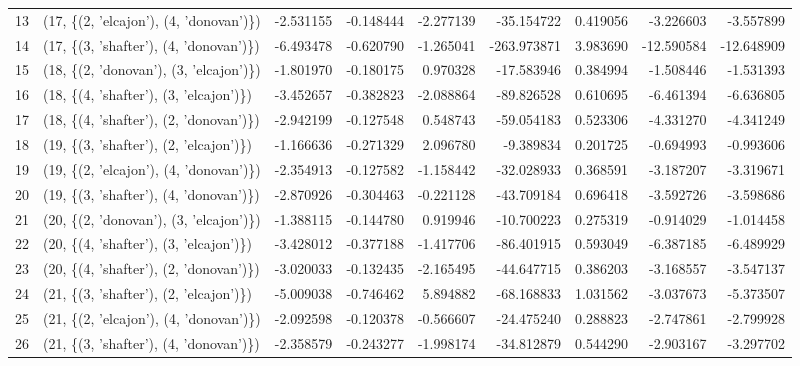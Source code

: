 \begin{tabular}{llrrrrrrr}
13 &  (17, \{(2, 'elcajon'), (4, 'donovan')\}) &  -2.531155 &  -0.148444 &  -2.277139 &   -35.154722 &   0.419056 &  -3.226603 &  -3.557899 \\
14 &  (17, \{(3, 'shafter'), (4, 'donovan')\}) &  -6.493478 &  -0.620790 &  -1.265041 &  -263.973871 &   3.983690 & -12.590584 & -12.648909 \\
15 &  (18, \{(2, 'donovan'), (3, 'elcajon')\}) &  -1.801970 &  -0.180175 &   0.970328 &   -17.583946 &   0.384994 &  -1.508446 &  -1.531393 \\
16 &  (18, \{(4, 'shafter'), (3, 'elcajon')\}) &  -3.452657 &  -0.382823 &  -2.088864 &   -89.826528 &   0.610695 &  -6.461394 &  -6.636805 \\
17 &  (18, \{(4, 'shafter'), (2, 'donovan')\}) &  -2.942199 &  -0.127548 &   0.548743 &   -59.054183 &   0.523306 &  -4.331270 &  -4.341249 \\
18 &  (19, \{(3, 'shafter'), (2, 'elcajon')\}) &  -1.166636 &  -0.271329 &   2.096780 &    -9.389834 &   0.201725 &  -0.694993 &  -0.993606 \\
19 &  (19, \{(2, 'elcajon'), (4, 'donovan')\}) &  -2.354913 &  -0.127582 &  -1.158442 &   -32.028933 &   0.368591 &  -3.187207 &  -3.319671 \\
20 &  (19, \{(3, 'shafter'), (4, 'donovan')\}) &  -2.870926 &  -0.304463 &  -0.221128 &   -43.709184 &   0.696418 &  -3.592726 &  -3.598686 \\
21 &  (20, \{(2, 'donovan'), (3, 'elcajon')\}) &  -1.388115 &  -0.144780 &   0.919946 &   -10.700223 &   0.275319 &  -0.914029 &  -1.014458 \\
22 &  (20, \{(4, 'shafter'), (3, 'elcajon')\}) &  -3.428012 &  -0.377188 &  -1.417706 &   -86.401915 &   0.593049 &  -6.387185 &  -6.489929 \\
23 &  (20, \{(4, 'shafter'), (2, 'donovan')\}) &  -3.020033 &  -0.132435 &  -2.165495 &   -44.647715 &   0.386203 &  -3.168557 &  -3.547137 \\
24 &  (21, \{(3, 'shafter'), (2, 'elcajon')\}) &  -5.009038 &  -0.746462 &   5.894882 &   -68.168833 &   1.031562 &  -3.037673 &  -5.373507 \\
25 &  (21, \{(2, 'elcajon'), (4, 'donovan')\}) &  -2.092598 &  -0.120378 &  -0.566607 &   -24.475240 &   0.288823 &  -2.747861 &  -2.799928 \\
26 &  (21, \{(3, 'shafter'), (4, 'donovan')\}) &  -2.358579 &  -0.243277 &  -1.998174 &   -34.812879 &   0.544290 &  -2.903167 &  -3.297702 \\
\bottomrule
\end{tabular}
